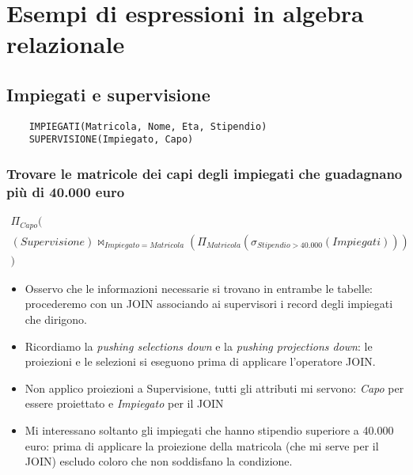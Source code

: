 \chapter{Esempi di espressioni in algebra relazionale}

\section*{Impiegati e supervisione}
\begin{verbatim}
	IMPIEGATI(Matricola, Nome, Eta, Stipendio)
	SUPERVISIONE(Impiegato, Capo)
\end{verbatim}
\subsection*{Trovare le matricole dei capi degli impiegati che guadagnano più di 40.000 euro}
\begin{align*}\Pi_{Capo}(\\(Supervisione) \Join_{Impiegato = Matricola} (\Pi_{Matricola} (\sigma_{Stipendio>40.000}(Impiegati)))\\)\end{align*}
\begin{itemize}
	
	\item Osservo che le informazioni necessarie si trovano in entrambe le tabelle: procederemo con un JOIN associando ai supervisori i record degli impiegati che dirigono.
	\item Ricordiamo la \emph{pushing selections down} e la \emph{pushing projections down}: le proiezioni e le selezioni si eseguono prima di applicare l'operatore JOIN.
	\item Non applico proiezioni a Supervisione, tutti gli attributi mi servono: \emph{Capo} per essere proiettato e \emph{Impiegato} per il JOIN
	\item Mi interessano soltanto gli impiegati che hanno stipendio superiore a 40.000 euro: prima di applicare la proiezione della matricola (che mi serve per il JOIN) escludo coloro che non soddisfano la condizione.
\end{itemize}
